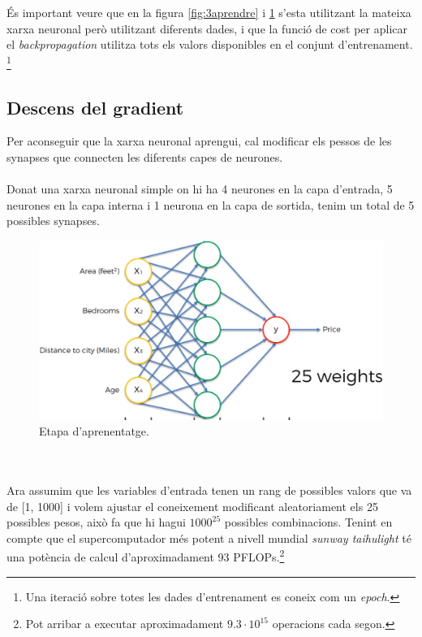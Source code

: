 \documentclass[12pt]{article}
\begin{document}
\\\\És important veure que en la figura \ref{fig:3aprendre} i \ref{fig:4bp} s'esta utilitzant la mateixa xarxa neuronal però utilitzant diferents dades, i que la funció de cost per aplicar el \textit{backpropagation} utilitza tots els valors disponibles en el conjunt d'entrenament. \footnote{Una iteració sobre totes les dades d'entrenament es coneix com un \textit{epoch}.}

\clearpage
\subsection{Descens del gradient\label{dg}}
Per aconseguir que la xarxa neuronal aprengui, cal modificar els pessos de les synapses que connecten les diferents capes de neurones.
\\\\Donat una xarxa neuronal simple on hi ha 4 neurones en la capa d'entrada, 5 neurones en la capa interna i 1 neurona en la capa de sortida, tenim un total de 5 possibles synapses. 
\begin{figure}[h!]
	\centering
	\includegraphics[scale=0.3]{imatges/dg/1dg.png}
	\caption{Etapa d'aprenentatge.}
	\label{fig:4bp}
\end{figure}
\\\\Ara assumim que les variables d'entrada tenen un rang de possibles valors que va de [1, 1000] i volem ajustar el coneixement modificant aleatoriament els 25 possibles pesos, això fa que hi hagui $1000^{25}$ possibles combinacions. Tenint en compte que el supercomputador més potent a nivell mundial \textit{sunway taihulight} té una potència de calcul d'aproximadament 93 PFLOPs.\footnote{Pot arribar a executar aproximadament $9.3 \cdot 10^{15}$ operacions cada segon.}
\end{document}
